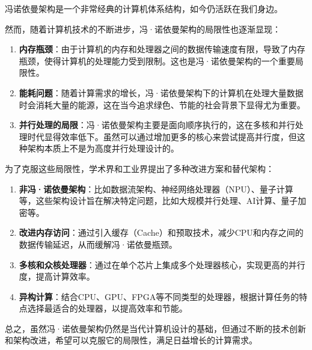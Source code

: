 \documentclass[12pt]{article} %
\theoremstyle{definition}
\begin{document}
冯诺依曼架构是一个非常经典的计算机体系结构，如今仍活跃在我们身边。

然而，随着计算机技术的不断进步，冯·诺依曼架构的局限性也逐渐显现：

\begin{enumerate}
  \item \textbf{内存瓶颈}：由于计算机的内存和处理器之间的数据传输速度有限，导致了内存瓶颈，使得计算机的处理能力受到限制。这也是冯·诺依曼架构的一个重要局限性。
  \item \textbf{能耗问题}：随着计算需求的增长，冯·诺依曼架构下的计算机在处理大量数据时会消耗大量的能源，这在当今追求绿色、节能的社会背景下显得尤为重要。
  \item \textbf{并行处理的局限}：冯·诺依曼架构主要是面向顺序执行的，这在多核和并行处理时代显得效率低下。虽然可以通过增加更多的核心来尝试提高并行度，但这种架构本质上不是为高度并行处理设计的。
\end{enumerate}

为了克服这些局限性，学术界和工业界提出了多种改进方案和替代架构：
\begin{enumerate}
  \item \textbf{非冯·诺依曼架构}：比如数据流架构、神经网络处理器（NPU）、量子计算等，这些架构设计旨在解决特定问题，比如大规模并行处理、AI计算、量子加密等。
  \item \textbf{改进内存访问}：通过引入缓存（Cache）和预取技术，减少CPU和内存之间的数据传输延迟，从而缓解冯·诺依曼瓶颈。
  \item \textbf{多核和众核处理器}：通过在单个芯片上集成多个处理器核心，实现更高的并行度，提高计算效率。
  \item \textbf{异构计算}：结合CPU、GPU、FPGA等不同类型的处理器，根据计算任务的特点选择最适合的处理器，以提高效率和节能。
\end{enumerate}

总之，虽然冯·诺依曼架构仍然是当代计算机设计的基础，但通过不断的技术创新和架构改进，希望可以克服它的局限性，满足日益增长的计算需求。

\newpage



\end{document}
